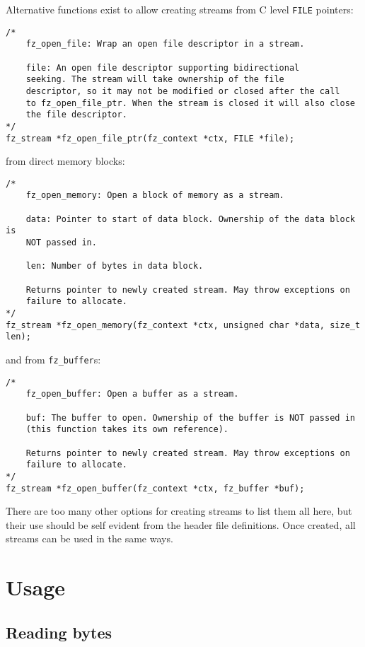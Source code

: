 \documentclass[oneside]{book}
\begin{document}
Alternative functions exist to allow creating streams from C level \texttt{FILE} pointers:

\begin{lstlisting}
/*
	fz_open_file: Wrap an open file descriptor in a stream.

	file: An open file descriptor supporting bidirectional
	seeking. The stream will take ownership of the file
	descriptor, so it may not be modified or closed after the call
	to fz_open_file_ptr. When the stream is closed it will also close
	the file descriptor.
*/
fz_stream *fz_open_file_ptr(fz_context *ctx, FILE *file);
\end{lstlisting}

from direct memory blocks:

\begin{lstlisting}
/*
	fz_open_memory: Open a block of memory as a stream.

	data: Pointer to start of data block. Ownership of the data block is
	NOT passed in.

	len: Number of bytes in data block.

	Returns pointer to newly created stream. May throw exceptions on
	failure to allocate.
*/
fz_stream *fz_open_memory(fz_context *ctx, unsigned char *data, size_t len);
\end{lstlisting}

and from \texttt{fz\_buffer}s:

\begin{lstlisting}
/*
	fz_open_buffer: Open a buffer as a stream.

	buf: The buffer to open. Ownership of the buffer is NOT passed in
	(this function takes its own reference).

	Returns pointer to newly created stream. May throw exceptions on
	failure to allocate.
*/
fz_stream *fz_open_buffer(fz_context *ctx, fz_buffer *buf);
\end{lstlisting}

There are too many other options for creating streams to list them all here, but their use should be self evident from the header file definitions. Once created, all streams can be used in the same ways.

\section{Usage}

\subsection{Reading bytes}
\end{document}
